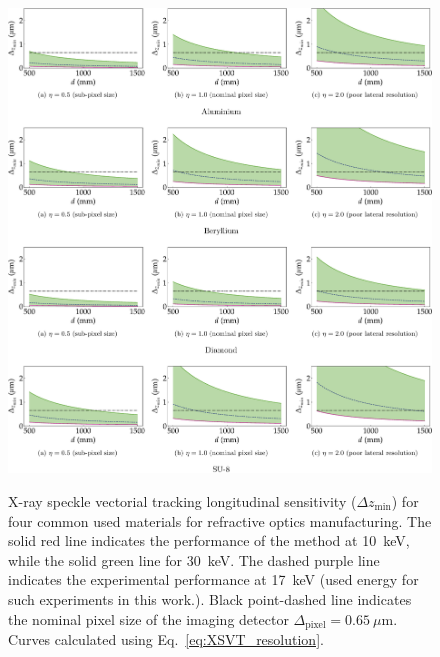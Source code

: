 \begin{refsection}
\begin{figure}[ht]
        \centering
        {\includegraphics[width=1.0\linewidth]{figures/ch04b/sensitivity_2.pdf}}
        \caption[XSVT sensitivity calculation]{X-ray speckle vectorial tracking longitudinal sensitivity ($\Delta{z_{\text{min}}}$) for four common used materials for refractive optics manufacturing. The solid red line indicates the performance of the method at 10~keV, while the solid green line for 30~keV. The dashed purple line indicates the experimental performance at 17~keV (used energy for such experiments in this work.). Black point-dashed line indicates the nominal pixel size of the imaging detector $\Delta_\text{pixel}=0.65~\mu$m. Curves calculated using Eq.~\ref{eq:XSVT_resolution}.}\label{fig:sensitivity_2}
\end{figure}

\clearpage

\printbibliography[heading=subbibliography]
\end{refsection}


